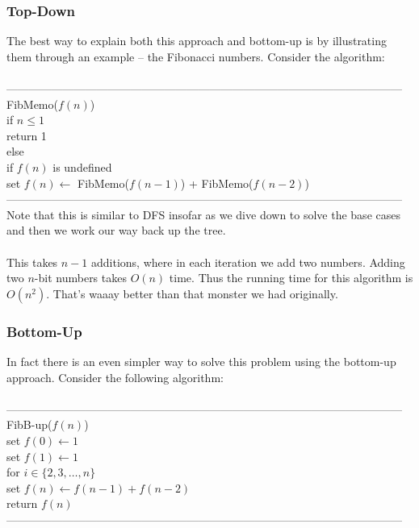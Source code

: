 \documentclass{article}
\begin{document}
\subsubsection{Top-Down}
The best way to explain both this approach and bottom-up is by illustrating them through an example -- the Fibonacci numbers. Consider the algorithm:\\\\
---------------------------------------------------------------------------------------------------------
FibMemo($f(n)$)\\
	\hspace*{7mm} if $n \leq 1$\\
	\hspace*{14mm} return 1\\
	\hspace*{7mm} else\\
	\hspace*{14mm} if $f(n)$ is undefined\\
	\hspace*{21mm} set $f(n) \leftarrow$ FibMemo($f(n-1)$) + FibMemo($f(n-2)$)\\
---------------------------------------------------------------------------------------------------------\\
Note that this is similar to DFS insofar as we dive down to solve the base cases and then we work our way back up the tree.\\\\
This takes $n-1$ additions, where in each iteration we add two numbers. Adding two $n$-bit numbers takes $O(n)$ time. Thus the running time for this algorithm is $O(n^2)$. That's waaay better than that monster we had originally.
\subsubsection{Bottom-Up}
In fact there is an even simpler way to solve this problem using the bottom-up approach. Consider the following algorithm:\\\\
---------------------------------------------------------------------------------------------------------
FibB-up($f(n)$)\\
	\hspace*{7mm} set $f(0) \leftarrow 1$\\
	\hspace*{7mm} set $f(1) \leftarrow 1$\\
	\hspace*{7mm} for $i \in \{2, 3, \dots, n\}$\\
	\hspace*{14mm} set $f(n) \leftarrow f(n-1) + f(n-2)$\\
	\hspace*{7mm} return $f(n)$\\
---------------------------------------------------------------------------------------------------------
\end{document}
